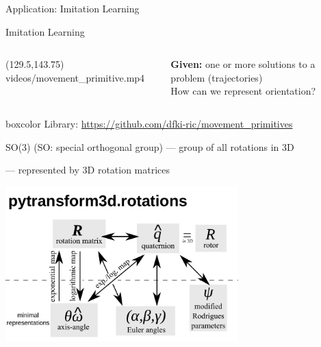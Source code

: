 \documentclass[14pt,aspectratio=169]{beamer}
\begin{document}
\begin{frame}
\begin{center}
\Large
Application: Imitation Learning
\end{center}
\end{frame}

\begin{frame}[fragile]{Imitation Learning}
\begin{columns}
\begin{column}{0.43\textwidth}
\makebox(129.5,143.75){
{videos/movement_primitive.mp4}}
\end{column}
\begin{column}{0.55\textwidth}
\textbf{Given:} one or more solutions to a problem (trajectories)\\[1em]

How can we represent orientation?
\end{column}
\end{columns}

\vfill

\begin{beamercolorbox}[wd=\textwidth,sep=5pt]{boxcolor}
\centering
{\footnotesize Library:
\url{https://github.com/dfki-ric/movement_primitives}}
\end{beamercolorbox}
\end{frame}

\begin{frame}{SO(3) (SO: special orthogonal group)}
--- group of all rotations in 3D

--- represented by 3D rotation matrices

\vfill

\begin{center}
\includegraphics[width=9cm]{images/rotations}
\end{center}
\end{frame}
\end{document}

